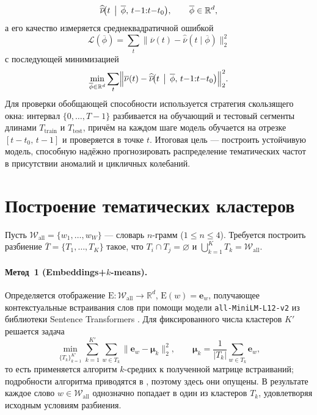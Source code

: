 \documentclass[14pt,a4paper]{article}
\begin{document}
\[
\widehat{\overline{\nu}}\!\bigl(t\,\bigm|\,\overline{\phi},\,t{-}1{:}t{-}t_0\bigr),\qquad\overline{\phi}\in\mathbb{R}^d,
\]
а его качество измеряется среднеквадратичной ошибкой
\[
\mathcal{L}(\overline{\phi})=\sum_{t}\bigl\|\overline{\nu}(t)-\widehat{\overline{\nu}}(t\mid\overline{\phi})\bigr\|_2^2
\]
с последующей минимизацией
\[
\min_{\overline{\phi}\in\mathbb{R}^d}\sum_{t}\Bigl\|\overline{\nu}(t)-\widehat{\overline{\nu}}\!\bigl(t\,\bigm|\,\overline{\phi},\,t{-}1{:}t{-}t_0\bigr)\Bigr\|_2^2.
\] \label{eq:classic_min}
Для проверки обобщающей способности используется стратегия скользящего окна: интервал $\{0,\dots,T-1\}$ разбивается на обучающий и тестовый сегменты длинами $T_{\mathrm{train}}$ и $T_{\mathrm{test}}$, причём на каждом шаге модель обучается на отрезке $[t{-}t_0,\,t{-}1]$ и проверяется в точке $t$. Итоговая цель — построить устойчивую модель, способную надёжно прогнозировать распределение тематических частот в присутствии аномалий и цикличных колебаний.



\newpage
\section{Построение тематических кластеров}\label{ssec:cluster_build}
Пусть $\mathcal{W}_{\mathrm{all}}=\{w_1,\dots,w_W\}$ — словарь $n$-грамм ($1\le n\le4$). Требуется построить разбиение $\overline{T}=\{T_1,\dots,T_K\}$ такое, что $T_i\cap T_j=\varnothing$ и $\bigcup_{k=1}^{K}T_k=\mathcal{W}_{\mathrm{all}}$. 

\paragraph{Метод~1 (Embeddings+$k$-means).}
Определяется отображение $\mathrm{E}\colon\mathcal{W}_{\mathrm{all}}\to\mathbb{R}^d$, $\mathrm{E}(w)=\mathbf e_w$, получающее контекстуальные встраивания слов при помощи модели \texttt{all-MiniLM-L12-v2} из библиотеки Sentence Transformers \cite{Reimers2019,SentenceTransformers}. Для фиксированного числа кластеров $K'$ решается задача 
\[
\min_{\{T_k\}_{k=1}^{K'}}\sum_{k=1}^{K'}\sum_{w\in T_k}\bigl\|\mathbf e_w-\boldsymbol\mu_k\bigr\|_2^{2},\qquad
\boldsymbol\mu_k=\frac{1}{|T_k|}\sum_{w\in T_k}\mathbf e_w,
\]
то есть применяется алгоритм $k$-средних к полученной матрице встраиваний; подробности алгоритма приводятся в \cite{sinaga2020unsupervised}, поэтому здесь они опущены. В результате каждое слово $w\in\mathcal{W}_{\mathrm{all}}$ однозначно попадает в один из кластеров $T_k$, удовлетворяя исходным условиям разбиения.
\end{document}
